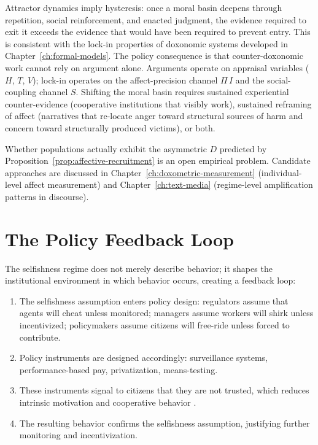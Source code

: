 Attractor dynamics imply hysteresis: once a moral basin deepens through repetition, social reinforcement, and enacted judgment, the evidence required to exit it exceeds the evidence that would have been required to prevent entry.
This is consistent with the lock-in properties of doxonomic systems developed in Chapter~\ref{ch:formal-models}.
The policy consequence is that counter-doxonomic work cannot rely on argument alone.
Arguments operate on appraisal variables ($H$, $T$, $V$); lock-in operates on the affect-precision channel $\Pi\,I$ and the social-coupling channel $S$.
Shifting the moral basin requires sustained experiential counter-evidence (cooperative institutions that visibly work), sustained reframing of affect (narratives that re-locate anger toward structural sources of harm and concern toward structurally produced victims), or both.

Whether populations actually exhibit the asymmetric $D$ predicted by Proposition~\ref{prop:affective-recruitment} is an open empirical problem.
Candidate approaches are discussed in Chapter~\ref{ch:doxometric-measurement} (individual-level affect measurement) and Chapter~\ref{ch:text-media} (regime-level amplification patterns in discourse).

\section{The Policy Feedback Loop}
\label{sec:ch21-policy}

The selfishness regime does not merely describe behavior; it shapes the institutional environment in which behavior occurs, creating a feedback loop:

\begin{model}
\label{mod:policy-feedback}
\begin{enumerate}[nosep]
  \item The selfishness assumption enters policy design: regulators assume that agents will cheat unless monitored; managers assume workers will shirk unless incentivized; policymakers assume citizens will free-ride unless forced to contribute.
  \item Policy instruments are designed accordingly: surveillance systems, performance-based pay, privatization, means-testing.
  \item These instruments signal to citizens that they are not trusted, which reduces intrinsic motivation and cooperative behavior \autocite{frey1997}.
  \item The resulting behavior confirms the selfishness assumption, justifying further monitoring and incentivization.
\end{enumerate}
\end{model}

